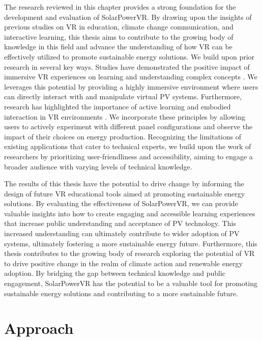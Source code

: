 \documentclass[draft, final]{vutinfth} %
\begin{document}
The research reviewed in this chapter provides a strong foundation for the development and evaluation of SolarPowerVR. By drawing upon the insights of previous studies on VR in education, climate change communication, and interactive learning, this thesis aims to contribute to the growing body of knowledge in this field and advance the understanding of how VR can be effectively utilized to promote sustainable energy solutions. We build upon prior research in several key ways. Studies have demonstrated the positive impact of immersive VR experiences on learning and understanding complex concepts \cite{Winn2002Immersion, Bailenson2008Transformations}. We leverages this potential by providing a highly immersive environment where users can directly interact with and manipulate virtual PV systems. Furthermore, research has highlighted the importance of active learning and embodied interaction in VR environments \cite{Queiroz2023Efficacy}. We incorporate these principles by allowing users to actively experiment with different panel configurations and observe the impact of their choices on energy production. Recognizing the limitations of existing applications that cater to technical experts, we build upon the work of researchers \cite{HuAu2018VrExperience} by prioritizing user-friendliness and accessibility, aiming to engage a broader audience with varying levels of technical knowledge.

The results of this thesis have the potential to drive change by informing the design of future VR educational tools aimed at promoting sustainable energy solutions. By evaluating the effectiveness of SolarPowerVR, we can provide valuable insights into how to create engaging and accessible learning experiences that increase public understanding and acceptance of PV technology. This increased understanding can ultimately contribute to wider adoption of PV systems, ultimately fostering a more sustainable energy future.  Furthermore, this thesis contributes to the growing body of research exploring the potential of VR to drive positive change in the realm of climate action and renewable energy adoption. By bridging the gap between technical knowledge and public engagement, SolarPowerVR has the potential to be a valuable tool for promoting sustainable energy solutions and contributing to a more sustainable future.

\chapter{Approach}
\end{document}
